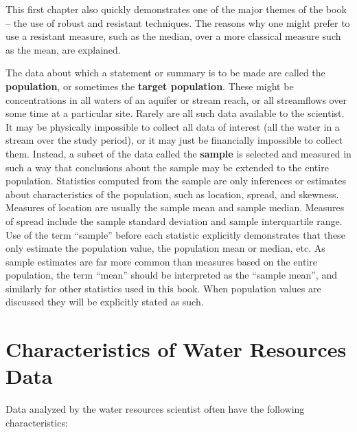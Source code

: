 \documentclass[]{book}
\begin{document}
This first chapter also quickly demonstrates one of the major themes of the book -- the use of robust and resistant techniques. The reasons why one might prefer to use a resistant measure, such as the median, over a more classical measure such as the mean, are explained.

The data about which a statement or summary is to be made are called the \textbf{population}, or sometimes the \textbf{target population}. These might be concentrations in all waters of an aquifer or stream reach, or all streamflows over some time at a particular site. Rarely are all such data available to the scientist. It may be physically impossible to collect all data of interest (all the water in a stream over the study period), or it may just be financially impossible to collect them. Instead, a subset of the data called the \textbf{sample} is selected and measured in such a way that conclusions about the sample may be extended to the entire population. Statistics computed from the sample are only inferences or estimates about characteristics of the population, such as location, spread, and skewness. Measures of location are usually the sample mean and sample median. Measures of spread include the sample standard deviation and sample interquartile range. Use of the term ``sample'' before each statistic explicitly demonstrates that these only estimate the population value, the population mean or median, etc. As sample estimates are far more common than measures based on the entire population, the term ``mean'' should be interpreted as the ``sample mean'', and similarly for other statistics used in this book. When population values are discussed they will be explicitly stated as such.

\hypertarget{characteristics-of-water-resources-data}{%
\section{Characteristics of Water Resources Data}\label{characteristics-of-water-resources-data}}

Data analyzed by the water resources scientist often have the following characteristics:
\end{document}
